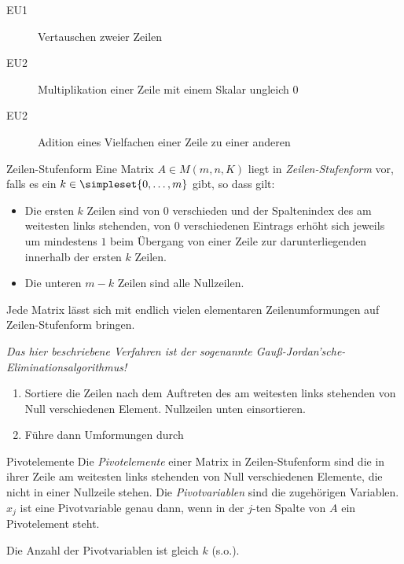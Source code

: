 \begin{description}
	\item[EU1] Vertauschen zweier Zeilen
	\item[EU2] Multiplikation einer Zeile mit einem Skalar ungleich $0$
	\item[EU2] Adition eines Vielfachen einer Zeile zu einer anderen
\end{description}

\begin{definition}{Zeilen-Stufenform}
	Eine Matrix $A\in M(m,n,K)$ liegt in \emph{Zeilen-Stufenform} vor, falls es ein $k\in \simpleset{0,\ldots, m}$ gibt, so dass gilt:
	\begin{itemize}
		\item Die ersten $k$ Zeilen sind von $0$ verschieden und der Spaltenindex des am weitesten links stehenden, von $0$ verschiedenen Eintrags erhöht sich jeweils um mindestens $1$ beim Übergang von einer Zeile zur darunterliegenden innerhalb der ersten $k$ Zeilen.
		\item Die unteren $m-k$ Zeilen sind alle Nullzeilen.
	\end{itemize}
\end{definition}


\begin{satz}{}
	Jede Matrix lässt sich mit endlich vielen elementaren Zeilenumformungen auf Zeilen-Stufenform bringen.
\end{satz}
\begin{beweis}
	\textit{Das hier beschriebene Verfahren ist der sogenannte Gauß-Jordan'sche-Eliminationsalgorithmus!}
	\begin{enumerate}
		\item Sortiere die Zeilen nach dem Auftreten des am weitesten links stehenden von Null verschiedenen Element. Nullzeilen unten einsortieren.
		\item Führe dann Umformungen durch
	\end{enumerate}
\end{beweis}


\begin{definition}{Pivotelemente}
	Die \emph{Pivotelemente} einer Matrix in Zeilen-Stufenform sind die in ihrer Zeile am weitesten links stehenden von Null verschiedenen Elemente, die nicht in einer Nullzeile stehen. Die \emph{Pivotvariablen} sind die zugehörigen Variablen. $x_j$ ist eine Pivotvariable genau dann, wenn in der $j$-ten Spalte von $A$ ein Pivotelement steht.
\end{definition}

Die Anzahl der Pivotvariablen ist gleich $k$ (s.o.).
